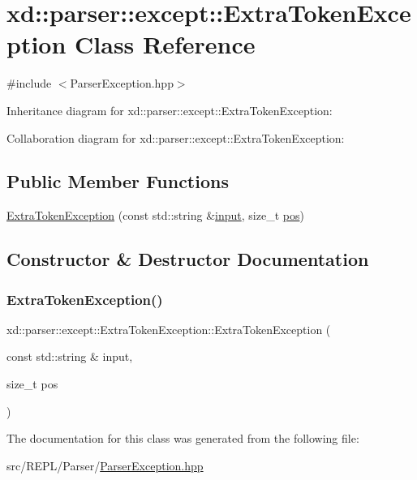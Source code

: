 \hypertarget{classxd_1_1parser_1_1except_1_1_extra_token_exception}{}\section{xd\+:\+:parser\+:\+:except\+:\+:Extra\+Token\+Exception Class Reference}
\label{classxd_1_1parser_1_1except_1_1_extra_token_exception}


{\ttfamily \#include $<$Parser\+Exception.\+hpp$>$}



Inheritance diagram for xd\+:\+:parser\+:\+:except\+:\+:Extra\+Token\+Exception\+:


Collaboration diagram for xd\+:\+:parser\+:\+:except\+:\+:Extra\+Token\+Exception\+:
\subsection*{Public Member Functions}
\begin{DoxyCompactItemize}
\item 
\mbox{\hyperlink{classxd_1_1parser_1_1except_1_1_extra_token_exception_a76088f4d8bd88f5f7b88e2f8b12d633b}{Extra\+Token\+Exception}} (const std\+::string \&\mbox{\hyperlink{classxd_1_1parser_1_1except_1_1_parser_exception_a6fde0ecef06df6bc2bcaef504269acea}{input}}, size\+\_\+t \mbox{\hyperlink{classxd_1_1parser_1_1except_1_1_parser_exception_ab58b07ce51aef576df0cfe45f0c7e222}{pos}})
\end{DoxyCompactItemize}


\subsection{Constructor \& Destructor Documentation}
\mbox{\label{classxd_1_1parser_1_1except_1_1_extra_token_exception_a76088f4d8bd88f5f7b88e2f8b12d633b}} 
\subsubsection{\texorpdfstring{Extra\+Token\+Exception()}{ExtraTokenException()}}
{\footnotesize\ttfamily xd\+::parser\+::except\+::\+Extra\+Token\+Exception\+::\+Extra\+Token\+Exception (\begin{DoxyParamCaption}\item[{const std\+::string \&}]{input,  }\item[{size\+\_\+t}]{pos }\end{DoxyParamCaption})\hspace{0.3cm}{\ttfamily [inline]}}



The documentation for this class was generated from the following file\+:\begin{DoxyCompactItemize}
\item 
src/\+R\+E\+P\+L/\+Parser/\mbox{\hyperlink{_parser_exception_8hpp}{Parser\+Exception.\+hpp}}\end{DoxyCompactItemize}
